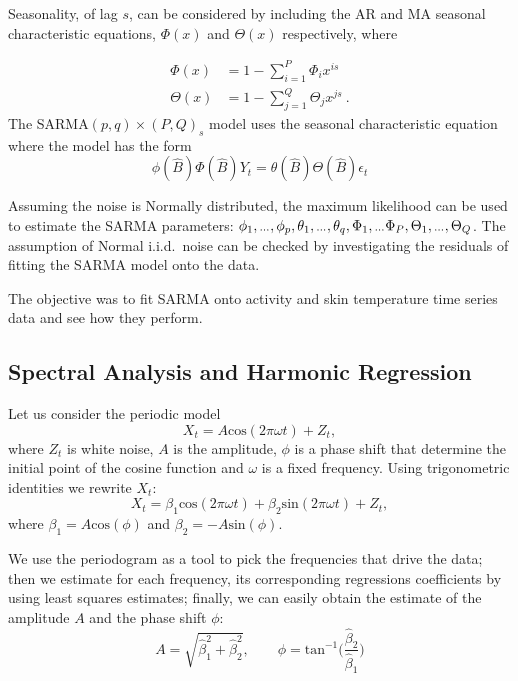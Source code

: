 \documentclass[]{article}
\newcommand{\dotdotdot}{\vphantom{.}_{\cdots}}
\newcommand{\backshift}{\widehat{B}}
\begin{document}
Seasonality, of lag $s$, can be considered by including the AR and MA seasonal characteristic equations, $\Phi(x)$ and $\Theta(x)$ respectively, where

\begin{align*}
\Phi(x) &= 1 - \sum_{i=1}^P \Phi_i x^{is} \\
\Theta(x) &= 1 - \sum_{j=1}^Q \Theta_j x^{js} \ .
\end{align*}
The SARMA$(p,q)\times(P,Q)_s$ model uses the seasonal characteristic equation where the model has the form
\begin{equation*}
\phi\left(\backshift\right)\Phi\left(\backshift\right)Y_t
=
\theta\left(\backshift\right)\Theta\left(\backshift\right)\epsilon_t
\end{equation*}

Assuming the noise is Normally distributed, the maximum likelihood can be used to estimate the SARMA parameters: $\phi_1,\dotdotdot,\phi_p,\theta_1,\dotdotdot,\theta_q,\Phi_1,\dotdotdot\Phi_P,\Theta_1,\dotdotdot,\Theta_Q$. The assumption of Normal i.i.d.~noise can be checked by investigating the residuals of fitting the SARMA model onto the data.

The objective was to fit SARMA onto activity and skin temperature time series data and see how they perform.

\subsection{Spectral Analysis and Harmonic Regression}

Let us consider the periodic model
\begin{equation*}
X_t = A\text{cos}(2\pi\omega t) + Z_t,
\end{equation*} 
where $Z_t$ is white noise, $A$ is the amplitude, $\phi$ is a phase shift that determine the initial point of the cosine function and $\omega$ is a fixed frequency. 
Using trigonometric identities we rewrite $X_t$:
\begin{equation}
X_t = \beta_1\text{cos}(2\pi\omega t) + \beta_2\text{sin}(2\pi\omega t) + Z_t,
\end{equation}
where $\beta_1 = A\text{cos}(\phi)$ and $\beta_2 = -A\text{sin}(\phi)$.

We use the periodogram as a tool to pick the frequencies that drive the data; then we estimate for each frequency, its corresponding regressions coefficients by using least squares estimates; finally, we can easily obtain the estimate of the amplitude $ A$ and the phase shift $\phi$:
\begin{equation}
A = \sqrt{\hat{\beta}_1^2 + \hat{\beta}_2^2}, \qquad \phi = \text{tan}^{-1}\Big(\frac{\hat{\beta}_2}{\hat{\beta}_1}\Big)
\end{equation}
\end{document}
